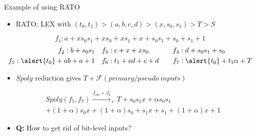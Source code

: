 \documentclass[xcolor=dvipsnames]{beamer}
\newcommand{\bi}{\begin{itemize}}
\newcommand{\ei}{\end{itemize}}
\newcommand{\Func}{{\mathcal{F}}}
\begin{document}
\begin{frame}{\large{Example of using RATO}}
\bi
\item RATO: LEX with $(t_0,t_1)>(a,b,c,d)>(x,s_0,s_1)>T>S$
\ei
\begin{equation*}
f_1: a+xs_0s_1+xs_0+xs_1+x+s_0s_1+s_0+s_1+1
\end{equation*}
\vspace{-0.8cm}
\begin{alignat*}{2}
f_2: b+s_0s_1 &~~~ f_3: c+x+xs_0 &&~~~f_4: d+s_0s_1+s_0 \\
f_5: \alert{t_0}+ab+a+1 &~~~ f_6: t_1+cd+c+d &&~~~ f_7: \alert{t_0}+t_1\alpha+T 
\end{alignat*}
\bi
\item $Spoly$ reduction gives $T+\Func(primary/pseudo~inputs)$
\ei
\begin{align}
&Spoly(f_5,f_7) \xrightarrow{J_{ckt}+J_0}_{+}T + s_0 s_1 x+\alpha s_0 s_1 \nonumber\\
&+(1+\alpha)s_0 x+(1+\alpha) s_0+s_1 x+s_1+(1+\alpha) x+1\nonumber
\end{align}
\bi
\item {\bf Q:} How to get rid of bit-level inputs?
\ei
\end{frame}
\end{document}
